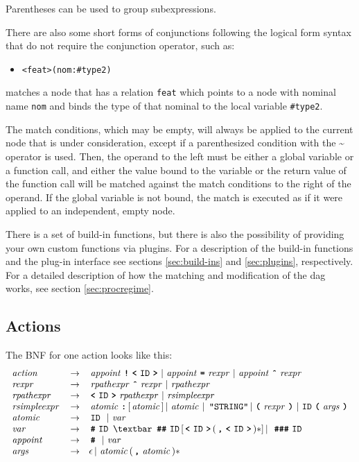 \documentclass[11pt,a4paper]{article}
\newcommand{\cd}[1]{\texttt{#1}}
\begin{document}
{Parentheses can be used to group subexpressions.

There are also some short forms of conjunctions following the logical form
syntax that do not require the conjunction operator, such as:

\begin{itemize}
\item[] \cd{<feat>(nom:\#type2)}
\end{itemize}
matches a node that has a relation \cd{feat} which points to a node with
nominal name \cd{nom} and binds the type of that nominal to the local variable
\cd{\#type2}.

The match conditions, which may be empty, will always be applied to the current
node that is under consideration, except if a parenthesized condition with the
\textbf{\~} operator is used. Then, the operand to the left must be either a
global variable or a function call, and either the value bound to the variable
or the return value of the function call will be matched against the match
conditions to the right of the operand. If the global variable is not bound,
the match is executed as if it were applied to an independent, empty node.

There is a set of build-in functions, but there is also the possibility of
providing your own custom functions via plugins. For a description of the
build-in functions and the plug-in interface see sections \ref{sec:build-ins}
and \ref{sec:plugins}, respectively. For a detailed description of how the
matching and modification of the dag works, see section \ref{sec:procregime}.

\subsection{Actions}

The BNF for one action looks like this:
\[
\begin{array}{lcl}
\nt{action} & \rightarrow & \nt{appoint} \tok{!} \tok{<}\id \tok{>} \BAR
\nt{appoint} \tok{=} \nt{rexpr} \BAR  \nt{appoint} \tok{\^{}} \nt{rexpr}\\
\nt{rexpr} & \rightarrow &
  \nt{rpathexpr} \tok{\^{}} \nt{rexpr} \BAR
  \nt{rpathexpr}\\
\nt{rpathexpr} & \rightarrow &
  \tok{<}\id \tok{>} \nt{rpathexpr} \BAR
  \nt{rsimpleexpr}\\
\nt{rsimpleexpr} & \rightarrow &
  \nt{atomic} \tok{:} [ \nt{atomic} ] \BAR
  \nt{atomic} \BAR \ \verb$"STRING"$  \BAR
  \tok{(} \nt{rexpr} \tok{)} \BAR
  \id\tok{(}\nt{args}\tok{)}\\
\nt{atomic} & \rightarrow & \id \ \BAR \nt{var}\\
\nt{var} & \rightarrow &
  \tok{\#}\id \ \textbar
  \ \tok{\#\#}\id [ \tok{<}\id \tok{>} ( \tok{,} \tok{<}\id \tok{>} )* ] \BAR
  \ \tok{\#\#\#}\id \\
\nt{appoint} & \rightarrow & \tok{\#}  \ \BAR \nt{var}\\
\nt{args} & \rightarrow & \epsilon
  \BAR \nt{atomic} (\tok{,} \nt{atomic})*
\end{array}
\]

}
\end{document}
